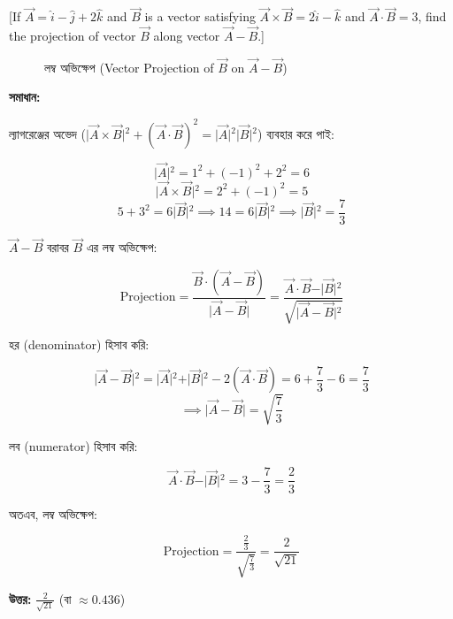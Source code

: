 \documentclass{article}
\begin{document}
[If $\vec{A} = \hat{i} - \hat{j} + 2\hat{k}$ and $\vec{B}$ is a vector satisfying $\vec{A} \times \vec{B} = 2\hat{i} - \hat{k}$ and $\vec{A} \cdot \vec{B} = 3$, find the projection of vector $\vec{B}$ along vector $\vec{A} - \vec{B}$.]

\begin{figure}[h!]
\centering
{}
\caption{লম্ব অভিক্ষেপ (Vector Projection of $\vec{B}$ on $\vec{A}-\vec{B}$)}
\end{figure}

\textbf{সমাধান:}

ল্যাগরেঞ্জের অভেদ ($\vert{}\vec{A} \times \vec{B}\vert{}^2 + (\vec{A} \cdot \vec{B})^2 = \vert{}\vec{A}\vert{}^2 \vert{}\vec{B}\vert{}^2$) ব্যবহার করে পাই:

$$\vert{}\vec{A}\vert{}^2 = 1^2 + (-1)^2 + 2^2 = 6$$
$$\vert{}\vec{A} \times \vec{B}\vert{}^2 = 2^2 + (-1)^2 = 5$$
$$5 + 3^2 = 6\vert{}\vec{B}\vert{}^2 \implies 14 = 6\vert{}\vec{B}\vert{}^2 \implies \vert{}\vec{B}\vert{}^2 = \frac{7}{3}$$

$\vec{A} - \vec{B}$ বরাবর $\vec{B}$ এর লম্ব অভিক্ষেপ:

$$\text{Projection} = \frac{\vec{B} \cdot (\vec{A} - \vec{B})}{\vert{}\vec{A} - \vec{B}\vert{}} = \frac{\vec{A} \cdot \vec{B} - \vert{}\vec{B}\vert{}^2}{\sqrt{\vert{}\vec{A} - \vec{B}\vert{}^2}}$$

হর (denominator) হিসাব করি:

$$\vert{}\vec{A} - \vec{B}\vert{}^2 = \vert{}\vec{A}\vert{}^2 + \vert{}\vec{B}\vert{}^2 - 2(\vec{A} \cdot \vec{B}) = 6 + \frac{7}{3} - 6 = \frac{7}{3}$$
$$\implies \vert{}\vec{A} - \vec{B}\vert{} = \sqrt{\frac{7}{3}}$$

লব (numerator) হিসাব করি:

$$\vec{A} \cdot \vec{B} - \vert{}\vec{B}\vert{}^2 = 3 - \frac{7}{3} = \frac{2}{3}$$

অতএব, লম্ব অভিক্ষেপ:

$$\text{Projection} = \frac{\frac{2}{3}}{\sqrt{\frac{7}{3}}} = \frac{2}{\sqrt{21}}$$

\textbf{উত্তর:} $\frac{2}{\sqrt{21}}$ (বা $\approx 0.436$)
\end{document}
